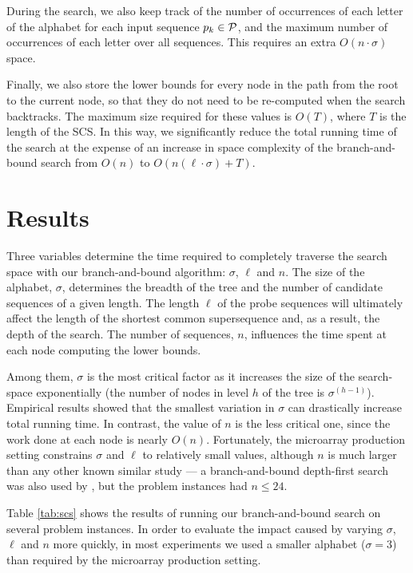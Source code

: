 During the search, we also keep track of the number of occurrences of each
letter of the alphabet for each input sequence $p_k \in {\mathcal{P}}$, and the maximum
number of occurrences of each letter over all sequences. This requires
an extra $O(n \cdot \sigma)$ space.

Finally, we also store the lower bounds for every node in the path from the root
to the current node, so that they do not need to be re-computed when the search
backtracks. The maximum size required for these values is $O(T)$, where $T$ is
the length of the SCS. In this way, we significantly reduce the total running
time of the search at the expense of an increase in space complexity of the
branch-and-bound search from $O(n)$ to $O(n(\ell \cdot \sigma) + T)$.

\section{Results}
\label{sec:scs_results}

Three variables determine the time required to completely traverse the search
space with our branch-and-bound algorithm: $\sigma$, $\ell$ and $n$. The size of
the alphabet, $\sigma$, determines the breadth of the tree and the number of
candidate sequences of a given length. The length $\ell$ of the probe
sequences will ultimately affect the length of the shortest common supersequence
and, as a result, the depth of the search. The number of sequences, $n$,
influences the time spent at each node computing the lower bounds.

Among them, $\sigma$ is the most critical factor as it increases the size of the
search-space exponentially (the number of nodes in level $h$ of the tree is
$\sigma^{(h - 1)}$). Empirical results showed that the smallest variation in
$\sigma$ can drastically increase total running time. In contrast, the value of
$n$ is the less critical one, since the work done at each node is nearly $O(n)$.
Fortunately, the microarray production setting constrains $\sigma$ and $\ell$
to relatively small values, although $n$ is much larger than any other known
similar study --- a branch-and-bound depth-first search was also used by
\citet{Fraser1995}, but the problem instances had $n \leq 24$.

Table \ref{tab:scs} shows the results of running our branch-and-bound search on
several problem instances. In order to evaluate the impact caused by varying
$\sigma$, $\ell$ and $n$ more quickly, in most experiments we used a smaller
alphabet ($\sigma = 3$) than required by the microarray production setting.

